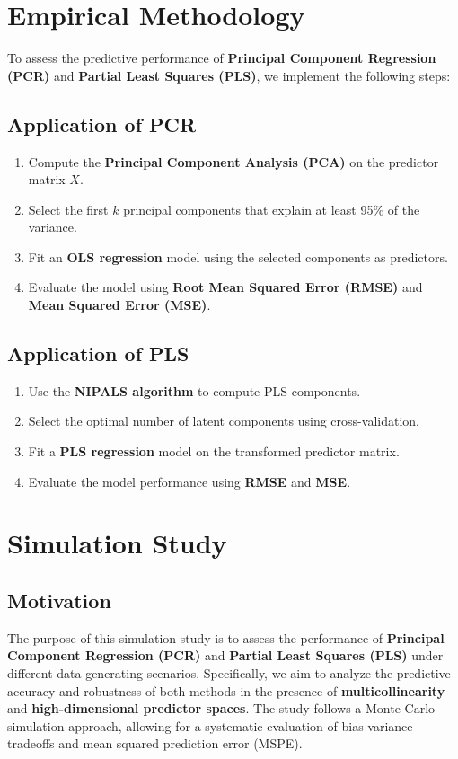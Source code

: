 \documentclass[11pt,twoside,a4paper]{article}
\begin{document}
\section{Empirical Methodology}

To assess the predictive performance of \textbf{Principal Component Regression (PCR)} and \textbf{Partial Least Squares (PLS)}, we implement the following steps:

\subsection{Application of PCR}
\begin{enumerate}
    \item Compute the \textbf{Principal Component Analysis (PCA)} on the predictor matrix \(X\).
    \item Select the first \(k\) principal components that explain at least 95\% of the variance.
    \item Fit an \textbf{OLS regression} model using the selected components as predictors.
    \item Evaluate the model using \textbf{Root Mean Squared Error (RMSE)} and \textbf{Mean Squared Error (MSE)}.
\end{enumerate}

\subsection{Application of PLS}
\begin{enumerate}
    \item Use the \textbf{NIPALS algorithm} to compute PLS components.
    \item Select the optimal number of latent components using cross-validation.
    \item Fit a \textbf{PLS regression} model on the transformed predictor matrix.
    \item Evaluate the model performance using \textbf{RMSE} and \textbf{MSE}.
\end{enumerate}

\section{Simulation Study}

\subsection{Motivation}
The purpose of this simulation study is to assess the performance of \textbf{Principal Component Regression (PCR)} and \textbf{Partial Least Squares (PLS)} under different data-generating scenarios. Specifically, we aim to analyze the predictive accuracy and robustness of both methods in the presence of \textbf{multicollinearity} and \textbf{high-dimensional predictor spaces}. The study follows a Monte Carlo simulation approach, allowing for a systematic evaluation of bias-variance tradeoffs and mean squared prediction error (MSPE).
\end{document}

